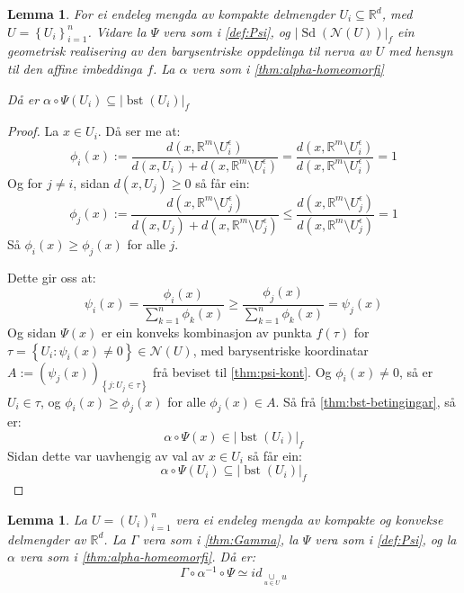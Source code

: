 \documentclass[a4paper, 12pt, norsk]{article}
\theoremstyle{plain}
\newtheorem{lemma}[theorem]{Lemma}
\theoremstyle{definition}
\newcommand{\Rb}{\mathbb{R}}
\newcommand{\Nc}{\mathcal{N}}
\newcommand{\union}{ \mathop{\cup}\limits }
\newcommand{\gr}[1]{ \lvert #1 \rvert } %
\newcommand{\set}[1]{ \left \{ #1 \right \} } %
\newcommand{\tuple}[1]{ \left( #1 \right) } %
\DeclareMathOperator{\Sd}{Sd}
\DeclareMathOperator{\bst}{bst}
\begin{document}
\begin{lemma} \label{thm:Psi-inni-bst}
	For ei endeleg mengda av kompakte delmengder \( U_i \subseteq \Rb^d \), med \( U = \set{U_i}_{i=1}^n \). Vidare la \( \Psi \) vera som i \autoref{def:Psi}, og \( \gr{\Sd(\Nc(U))}_f \) ein geometrisk realisering av den barysentriske oppdelinga til nerva av \( U \) med hensyn til den affine imbeddinga \( f \). La \( \alpha \) vera som i \autoref{thm:alpha-homeomorfi}

	Då er \( \alpha \circ \Psi(U_i) \subseteq \gr{\bst(U_i)}_f \)
\end{lemma}

\begin{proof}
	La \( x \in U_i \). Då ser me at:
	\[
		\phi_i(x) := \frac{d(x, \Rb^m \setminus U_i^\epsilon)}{d(x, U_i) + d(x, \Rb^m \setminus U_i^\epsilon)} = \frac{d(x, \Rb^m \setminus U_i^\epsilon)}{d(x, \Rb^m \setminus U_i^\epsilon)} = 1
	\] 
	Og for \( j \neq i \), sidan \( d(x, U_j) \geq 0 \) så får ein:
	\[
		\phi_j(x) := \frac{d(x, \Rb^m \setminus U_j^\epsilon)}{d(x, U_j) + d(x, \Rb^m \setminus U_j^\epsilon)} \leq \frac{d(x, \Rb^m \setminus U_j^\epsilon)}{d(x, \Rb^m \setminus U_j^\epsilon)} = 1
	\]
	Så \( \phi_i(x) \geq \phi_j(x) \) for alle \( j \).

	Dette gir oss at:
	\[
		\psi_i(x) = \frac{\phi_i(x)}{\sum_{k=1}^n \phi_k(x)} \geq \frac{\phi_j(x)}{\sum_{k=1}^n \phi_k(x)} = \psi_j(x)
	\]
	Og sidan \( \Psi(x) \) er ein konveks kombinasjon av punkta \( f(\tau) \) for \( \tau = \set{U_i : \psi_i(x) \neq 0} \in \Nc(U) \), med barysentriske koordinatar \( A:= \tuple{\psi_j(x)}_{\set{ j : U_j\in \tau}} \) frå beviset til \autoref{thm:psi-kont}. Og \( \phi_i(x) \neq 0 \), så er \( U_i \in \tau \), og \( \phi_i(x) \geq \phi_j(x) \) for alle \( \phi_j(x) \in A \). Så frå \autoref{thm:bst-betingingar}, så er:
	\[
		\alpha \circ \Psi(x) \in \gr{\bst(U_i)}_f
	\]
	Sidan dette var uavhengig av val av \( x \in U_i \) så får ein:
	\[
		\alpha \circ \Psi(U_i) \subseteq \gr{\bst(U_i)}_f
	\]
\end{proof}

\begin{lemma} \label{thm:homeq-u}
	La \( U = \tuple{U_i}_{i=1}^n \) vera ei endeleg mengda av kompakte og konvekse delmengder av \( \Rb^d \). La \( \Gamma \) vera som i \autoref{thm:Gamma}, la \( \Psi \) vera som i \autoref{def:Psi}, og la \( \alpha \) vera som i \autoref{thm:alpha-homeomorfi}. Då er:
	\[
		\Gamma \circ \alpha^{-1} \circ \Psi \simeq id_{\union_{u \in U} u} 
	\]
\end{lemma}
\end{document}
